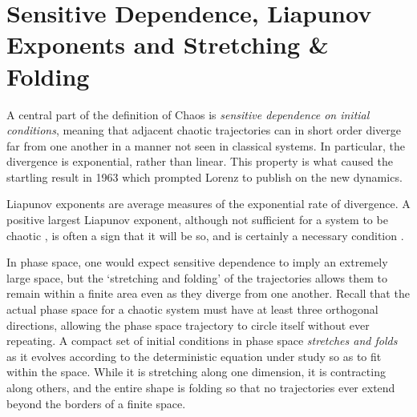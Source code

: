 \documentclass[12pt,twoside]{reedthesis}
\begin{document}

\section{Sensitive Dependence, Liapunov Exponents and Stretching \& Folding}

A central part of the definition of Chaos is \textit{sensitive dependence on initial conditions}, meaning that adjacent chaotic trajectories can in short order diverge far from one another in a manner not seen in classical systems.  In particular, the divergence is exponential, rather than linear.  This property is what caused the startling result in 1963 which prompted Lorenz to publish on the new dynamics.  

Liapunov exponents are average measures of the exponential rate of divergence.  A positive largest Liapunov exponent, although not sufficient for a system to be chaotic \cite{leonov2007}, is often a sign that it will be so, and is certainly a necessary condition \cite{bakergollub1996}.  


In phase space, one would expect sensitive dependence to imply an extremely large space, but the `stretching and folding' of the trajectories allows them to remain within a finite area even as they diverge from one another.  Recall that the actual phase space for a chaotic system must have at least three orthogonal directions, allowing the phase space trajectory to circle itself without ever repeating.  A compact set of initial conditions in phase space \textit{stretches and folds} as it evolves according to the deterministic equation under study so as to fit within the space.  While it is stretching along one dimension, it is contracting along others, and the entire shape is folding so that no trajectories ever extend beyond the borders of a finite space.  
\end{document}
